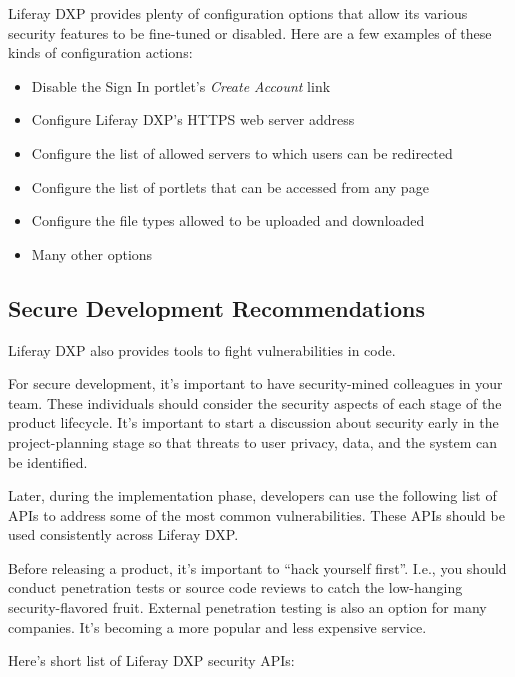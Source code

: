 Liferay DXP provides plenty of configuration options that allow its
various security features to be fine-tuned or disabled. Here are a few
examples of these kinds of configuration actions:

\begin{itemize}
\tightlist
\item
  Disable the Sign In portlet's \emph{Create Account} link
\item
  Configure Liferay DXP's HTTPS web server address
\item
  Configure the list of allowed servers to which users can be redirected
\item
  Configure the list of portlets that can be accessed from any page
\item
  Configure the file types allowed to be uploaded and downloaded
\item
  Many other options
\end{itemize}

\subsection{Secure Development
Recommendations}\label{secure-development-recommendations}

Liferay DXP also provides tools to fight vulnerabilities in code.

For secure development, it's important to have security-mined colleagues
in your team. These individuals should consider the security aspects of
each stage of the product lifecycle. It's important to start a
discussion about security early in the project-planning stage so that
threats to user privacy, data, and the system can be identified.

Later, during the implementation phase, developers can use the following
list of APIs to address some of the most common vulnerabilities. These
APIs should be used consistently across Liferay DXP.

Before releasing a product, it's important to ``hack yourself first''.
I.e., you should conduct penetration tests or source code reviews to
catch the low-hanging security-flavored fruit. External penetration
testing is also an option for many companies. It's becoming a more
popular and less expensive service.

Here's short list of Liferay DXP security APIs:

